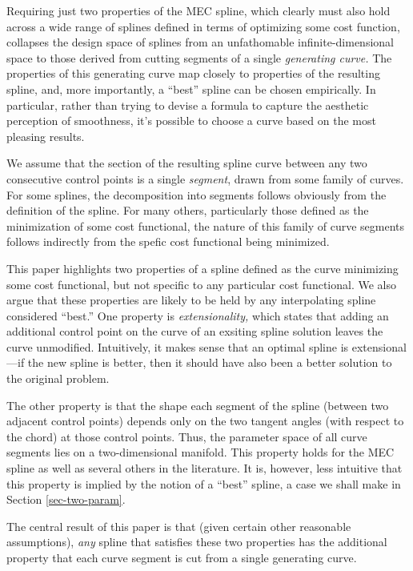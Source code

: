 \documentclass{article}
\begin{document}
Requiring just two properties of the MEC spline, which clearly must
also hold across a wide range of splines defined in terms of
optimizing some cost function, collapses the design space of splines
from an unfathomable infinite-dimensional space to those derived from
cutting segments of a single \emph{generating curve.} The properties
of this generating curve map closely to properties of the resulting
spline, and, more importantly, a ``best'' spline can be chosen
empirically. In particular, rather than trying to devise a formula to
capture the aesthetic perception of smoothness, it's possible to
choose a curve based on the most pleasing results.

We assume that the section of the resulting spline curve between any
two consecutive control points is a single \emph{segment}, drawn from
some family of curves. For some splines, the decomposition into
segments follows obviously from the definition of the spline. For many
others, particularly those defined as the minimization of some cost
functional, the nature of this family of curve segments follows
indirectly from the spefic cost functional being minimized.

This paper highlights two properties of a spline defined as the curve
minimizing some cost functional, but not specific to any particular
cost functional. We also argue that these properties are likely to be
held by any interpolating spline considered ``best.'' One property is
\emph{extensionality,} which states that adding an additional control
point on the curve of an exsiting spline solution leaves the curve
unmodified. Intuitively, it makes sense that an optimal spline is
extensional---if the new spline is better, then it should have also
been a better solution to the original problem.

The other property is that the shape each segment of the spline
(between two adjacent control points) depends only on the two tangent
angles (with respect to the chord) at those control points. Thus, the
parameter space of all curve segments lies on a two-dimensional
manifold. This property holds for the MEC spline as well as several
others in the literature. It is, however, less intuitive that this
property is implied by the notion of a ``best'' spline, a case we
shall make in Section \ref{sec-two-param}.

The central result of this paper is that (given certain other
reasonable assumptions), \emph{any} spline that satisfies these two
properties has the additional property that each curve segment is cut
from a single generating curve.
\end{document}
